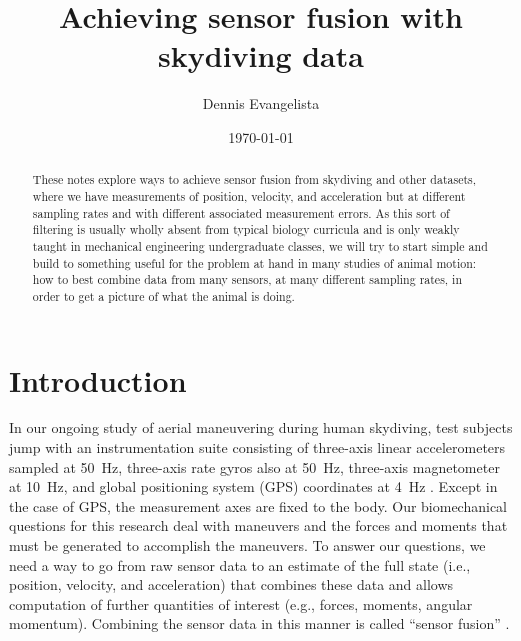 \documentclass{amsart}
\title{Achieving sensor fusion with skydiving data}
\author{Dennis Evangelista}
\date{\today}
\begin{document}
\begin{abstract}
These notes explore ways to achieve sensor fusion from skydiving and other datasets, where we have measurements of position, velocity, and acceleration but at different sampling rates and with different associated measurement errors.  As this sort of filtering is usually wholly absent from typical biology curricula and is only weakly taught in mechanical engineering undergraduate classes, we will try to start simple and build to something useful for the problem at hand in many studies of animal motion: how to best combine data from many sensors, at many different sampling rates, in order to get a picture of what the animal is doing. 
\end{abstract}
\maketitle
\tableofcontents

\section{Introduction}
In our ongoing study of aerial maneuvering during human skydiving, test subjects jump with an instrumentation suite consisting of three-axis linear accelerometers sampled at \SI{50}{\hertz}, three-axis rate gyros also at \SI{50}{\hertz}, three-axis magnetometer at \SI{10}{\hertz}, and global positioning system (GPS) coordinates at \SI{4}{\hertz} \cite{Cardona:2011, Evangelista:2012}.  Except in the case of GPS, the measurement axes are fixed to the body. Our biomechanical questions for this research deal with maneuvers and the forces and moments that must be generated to accomplish the maneuvers.  To answer our questions, we need a way to go from raw sensor data to an estimate of the full state (i.e., position, velocity, and acceleration) that combines these data and allows computation of further quantities of interest (e.g., forces, moments, angular momentum). Combining the sensor data in this manner is called ``sensor fusion'' \cite{Son-of-Mohg:2388}.  
\end{document}

